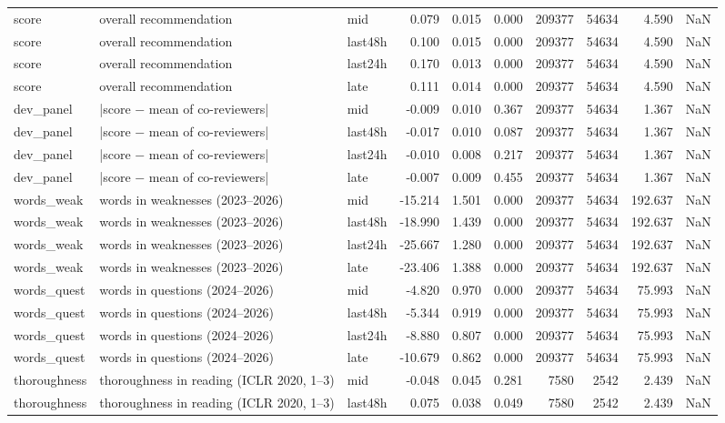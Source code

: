 \begin{table}
\begin{tabular}{lllrrrrrrr}
score & overall recommendation & mid & 0.079 & 0.015 & 0.000 & 209377 & 54634 & 4.590 & NaN \\
score & overall recommendation & last48h & 0.100 & 0.015 & 0.000 & 209377 & 54634 & 4.590 & NaN \\
score & overall recommendation & last24h & 0.170 & 0.013 & 0.000 & 209377 & 54634 & 4.590 & NaN \\
score & overall recommendation & late & 0.111 & 0.014 & 0.000 & 209377 & 54634 & 4.590 & NaN \\
dev\_panel & |score − mean of co-reviewers| & mid & -0.009 & 0.010 & 0.367 & 209377 & 54634 & 1.367 & NaN \\
dev\_panel & |score − mean of co-reviewers| & last48h & -0.017 & 0.010 & 0.087 & 209377 & 54634 & 1.367 & NaN \\
dev\_panel & |score − mean of co-reviewers| & last24h & -0.010 & 0.008 & 0.217 & 209377 & 54634 & 1.367 & NaN \\
dev\_panel & |score − mean of co-reviewers| & late & -0.007 & 0.009 & 0.455 & 209377 & 54634 & 1.367 & NaN \\
words\_weak & words in weaknesses (2023–2026) & mid & -15.214 & 1.501 & 0.000 & 209377 & 54634 & 192.637 & NaN \\
words\_weak & words in weaknesses (2023–2026) & last48h & -18.990 & 1.439 & 0.000 & 209377 & 54634 & 192.637 & NaN \\
words\_weak & words in weaknesses (2023–2026) & last24h & -25.667 & 1.280 & 0.000 & 209377 & 54634 & 192.637 & NaN \\
words\_weak & words in weaknesses (2023–2026) & late & -23.406 & 1.388 & 0.000 & 209377 & 54634 & 192.637 & NaN \\
words\_quest & words in questions (2024–2026) & mid & -4.820 & 0.970 & 0.000 & 209377 & 54634 & 75.993 & NaN \\
words\_quest & words in questions (2024–2026) & last48h & -5.344 & 0.919 & 0.000 & 209377 & 54634 & 75.993 & NaN \\
words\_quest & words in questions (2024–2026) & last24h & -8.880 & 0.807 & 0.000 & 209377 & 54634 & 75.993 & NaN \\
words\_quest & words in questions (2024–2026) & late & -10.679 & 0.862 & 0.000 & 209377 & 54634 & 75.993 & NaN \\
thoroughness & thoroughness in reading (ICLR 2020, 1–3) & mid & -0.048 & 0.045 & 0.281 & 7580 & 2542 & 2.439 & NaN \\
thoroughness & thoroughness in reading (ICLR 2020, 1–3) & last48h & 0.075 & 0.038 & 0.049 & 7580 & 2542 & 2.439 & NaN \\

\end{tabular}
\end{table}
